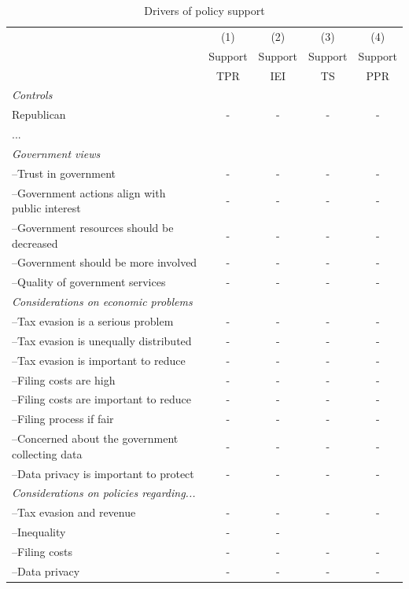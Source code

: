 \documentclass[11pt]{article}
\begin{document}
\begin{table}[!htbp]\centering
\caption{Drivers of policy support}
\label{tab:PolicySupportDrivers}
\begin{threeparttable}
\begin{tabular}{l|cccc}
\toprule
& (1) & (2) & (3) & (4) \\
 & Support & Support & Support & Support  \\
 & TPR  & IEI & TS & PPR \\
\midrule
\textit{Controls} \\
Republican                 & - & - & - & - \\
... \\[1em]

\textit{Government views}\\
--Trust in government       & - & -& - & - \\
--Government actions align with public interest     & - & -& - & - \\
--Government resources should be decreased     & - & -& - & - \\
--Government should be more involved     & - & -& - & - \\
--Quality of government services      & - & -& - & - \\[1em]

\textit{Considerations on economic problems}\\
--Tax evasion is a serious problem        & - & -& - & - \\
--Tax evasion is unequally distributed     & - & -& - & - \\
--Tax evasion is important to reduce & - & -& - & - \\
--Filing costs are high               & - & -& - & - \\
--Filing costs are important to reduce    & - & -& - & - \\
--Filing process if fair & - & -& - & - \\
--Concerned about the government collecting data    & - & -& - & - \\
--Data privacy is important to protect    & - & -& - & - \\[1em]

\textit{Considerations on policies regarding...}\\
--Tax evasion and revenue    & - & -& - & - \\
--Inequality          & - & -&   &   \\
--Filing costs        & - & -& - & - \\
--Data privacy        & - & -& - & - \\[1em]


\end{tabular}
\end{threeparttable}
\end{table}
\end{document}
